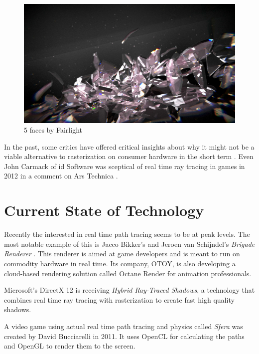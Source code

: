 \documentclass[
  twoside,
  11pt, a4paper,
  footinclude=true,
  headinclude=true,
  cleardoublepage=empty
]{scrreprt}
\begin{document}
\begin{figure}[H]
    \includegraphics[scale=0.5]{5faces}
    \centering
    \caption{5 faces by Fairlight}
    \label{fig:5faces}
\end{figure}

In the past, some critics have offered critical insights about why it might not be a viable
alternative to rasterization on consumer hardware in the short term
\cite{site:raytracing-vs-rasterization} \cite{site:codinghorror-raytracing}. Even John Carmack of
id Software was sceptical of real time ray tracing in games in 2012 in a comment on Ars Technica
\cite{site:carmack-scepticism}.

\section{Current State of Technology}
Recently the interested in real time path tracing seems to be at peak levels. The most notable
example of this is Jacco Bikker's and Jeroen van Schijndel's \emph{Brigade Renderer} \cite{article:brigade}
\cite{site:brigade}. This renderer is aimed at game developers and is meant to run on commodity
hardware in real time. Its company, OTOY, is also developing a cloud-based rendering solution
called Octane Render \cite{site:octane} for animation professionals.

Microsoft's DirectX 12 \cite{site:dx12-raytracing} is receiving \emph{Hybrid Ray-Traced Shadows}, a
technology that combines real time ray tracing with rasterization to create fast high quality
shadows.

A video game using actual real time path tracing and physics called \emph{Sfera} was created by
David Bucciarelli \cite{site:sfera} in 2011. It uses OpenCL for calculating the paths and OpenGL to
render them to the screen.
\end{document}
